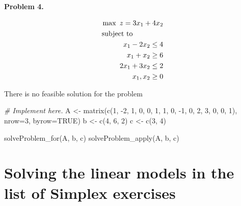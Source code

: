 \documentclass[
]{article}
\newenvironment{Shaded}{\begin{snugshade}}{\end{snugshade}}
\newcommand{\AttributeTok}[1]{\textcolor[rgb]{0.77,0.63,0.00}{#1}}
\newcommand{\CommentTok}[1]{\textcolor[rgb]{0.56,0.35,0.01}{\textit{#1}}}
\newcommand{\ConstantTok}[1]{\textcolor[rgb]{0.00,0.00,0.00}{#1}}
\newcommand{\DecValTok}[1]{\textcolor[rgb]{0.00,0.00,0.81}{#1}}
\newcommand{\FunctionTok}[1]{\textcolor[rgb]{0.00,0.00,0.00}{#1}}
\newcommand{\NormalTok}[1]{#1}
\newcommand{\OtherTok}[1]{\textcolor[rgb]{0.56,0.35,0.01}{#1}}
\newcommand{\SpecialCharTok}[1]{\textcolor[rgb]{0.00,0.00,0.00}{#1}}
\begin{document}
\textbf{Problem 4.}

\vspace{-0.5cm}

\begin{eqnarray*}
\max\ z=3x_{1}+4x_{2}\\
\mbox{subject to}\hspace{1.5cm}\\
x_{1}-2x_{2}\leq 4\\
x_{1}+x_{2}\geq 6\\
2x_{1}+3x_{2}\leq 2  \\
x_{1},x_{2}\geq 0\\
\end{eqnarray*}

There is no feasible solution for the problem

\begin{Shaded}
\begin{Highlighting}[]
\CommentTok{\# Implement here.}
\NormalTok{A }\OtherTok{\textless{}{-}} \FunctionTok{matrix}\NormalTok{(}\FunctionTok{c}\NormalTok{(}\DecValTok{1}\NormalTok{, }\SpecialCharTok{{-}}\DecValTok{2}\NormalTok{, }\DecValTok{1}\NormalTok{, }\DecValTok{0}\NormalTok{, }\DecValTok{0}\NormalTok{, }\DecValTok{1}\NormalTok{, }\DecValTok{1}\NormalTok{, }\DecValTok{0}\NormalTok{, }\SpecialCharTok{{-}}\DecValTok{1}\NormalTok{, }\DecValTok{0}\NormalTok{, }\DecValTok{2}\NormalTok{, }\DecValTok{3}\NormalTok{, }\DecValTok{0}\NormalTok{, }\DecValTok{0}\NormalTok{, }\DecValTok{1}\NormalTok{), }\AttributeTok{nrow=}\DecValTok{3}\NormalTok{, }\AttributeTok{byrow=}\ConstantTok{TRUE}\NormalTok{)}
\NormalTok{b }\OtherTok{\textless{}{-}} \FunctionTok{c}\NormalTok{(}\DecValTok{4}\NormalTok{, }\DecValTok{6}\NormalTok{, }\DecValTok{2}\NormalTok{)}
\NormalTok{c }\OtherTok{\textless{}{-}} \FunctionTok{c}\NormalTok{(}\DecValTok{3}\NormalTok{, }\DecValTok{4}\NormalTok{)}

\FunctionTok{solveProblem\_for}\NormalTok{(A, b, c)}
\FunctionTok{solveProblem\_apply}\NormalTok{(A, b, c)}
\end{Highlighting}
\end{Shaded}

\pagebreak

\hypertarget{solving-the-linear-models-in-the-list-of-simplex-exercises}{%
\section{Solving the linear models in the list of Simplex
exercises}\label{solving-the-linear-models-in-the-list-of-simplex-exercises}}
\end{document}
